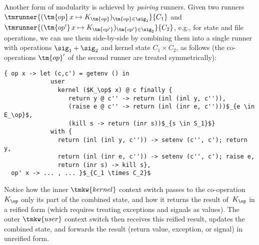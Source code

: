 \begin{example}[Pairing]
%
\label{ex:pairing}
%
  Another form of modularity is achieved by \emph{pairing} runners. Given two runners
  $\tmrunner{(\tm{op}\,x \mapsto K_{\tm{op}})_{\tm{op} \in \sig_1}}{C_1}$ and
  $\tmrunner{(\tm{op'}\,x \mapsto K_{\tm{op'}})_{\tm{op'} \in \sig_2}}{C_2}$, e.g., for state
  and file operations, we can use them side-by-side by combining them into a single runner
  with operations $\sig_1 + \sig_2$ and kernel state $C_1 \times C_2$, as follows (the
  co-operations $\tm{op}'$ of the second runner are treated symmetrically):
%
\begin{lstlisting}
{ op x -> let (c,c') = getenv () in
             user
               kernel ($K_\op$ x) @ c finally {
                  return y @ c'' -> return (inl (inl y, c'')),
                  (raise e @ c'' -> return (inl (inr e, c'')))$_{e \in E_\op}$, 
                  (kill s -> return (inr s))$_{s \in S_1}$}
             with {
               return (inl (inl y, c'')) -> setenv (c'', c'); return y,
               return (inl (inr e, c'')) -> setenv (c'', c'); raise e,
               return (inr s) -> kill s},
  op' x -> ... , ... }$_{C_1 \times C_2}$
\end{lstlisting}
%
Notice how the inner $\tmkw{kernel}$ context switch passes to the co-operation~$K_\op$ 
only its part of the combined state, and
how it returns the result of~$K_\op$ in a reified form (which requires treating exceptions and signals 
as values). The outer $\tmkw{user}$ context switch then receives this reified result, updates the combined state,
and forwards the result (return value, exception, or signal) in unreified form.
\end{example}


